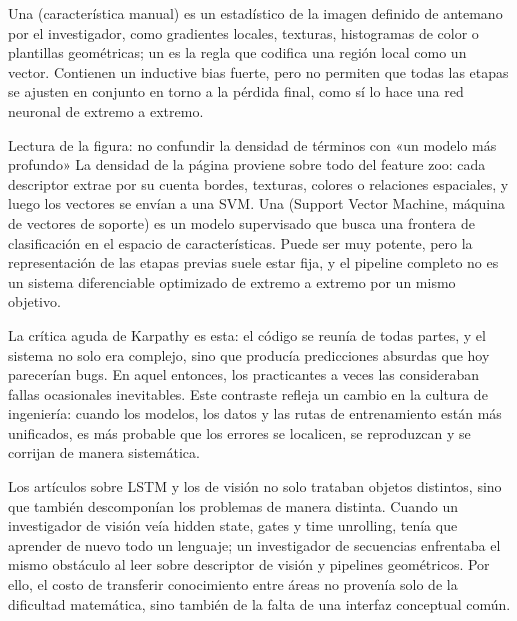 Una  (característica manual) es un estadístico de la imagen definido de antemano por el investigador, como gradientes locales, texturas, histogramas de color o plantillas geométricas; un  es la regla que codifica una región local como un vector. Contienen un inductive bias fuerte, pero no permiten que todas las etapas se ajusten en conjunto en torno a la pérdida final, como sí lo hace una red neuronal de extremo a extremo.


\begin{knowledgebox}{Lectura de la figura: no confundir la densidad de términos con «un modelo más profundo»}
La densidad de la página proviene sobre todo del feature zoo: cada descriptor extrae por su cuenta bordes, texturas, colores o relaciones espaciales, y luego los vectores se envían a una SVM. Una  (Support Vector Machine, máquina de vectores de soporte) es un modelo supervisado que busca una frontera de clasificación en el espacio de características. Puede ser muy potente, pero la representación de las etapas previas suele estar fija, y el pipeline completo no es un sistema diferenciable optimizado de extremo a extremo por un mismo objetivo.
\end{knowledgebox}

La crítica aguda de Karpathy es esta: el código se reunía de todas partes, y el sistema no solo era complejo, sino que producía predicciones absurdas que hoy parecerían bugs. En aquel entonces, los practicantes a veces las consideraban fallas ocasionales inevitables. Este contraste refleja un cambio en la cultura de ingeniería: cuando los modelos, los datos y las rutas de entrenamiento están más unificados, es más probable que los errores se localicen, se reproduzcan y se corrijan de manera sistemática.


Los artículos sobre LSTM y los de visión no solo trataban objetos distintos, sino que también descomponían los problemas de manera distinta. Cuando un investigador de visión veía hidden state, gates y time unrolling, tenía que aprender de nuevo todo un lenguaje; un investigador de secuencias enfrentaba el mismo obstáculo al leer sobre descriptor de visión y pipelines geométricos. Por ello, el costo de transferir conocimiento entre áreas no provenía solo de la dificultad matemática, sino también de la falta de una interfaz conceptual común.

